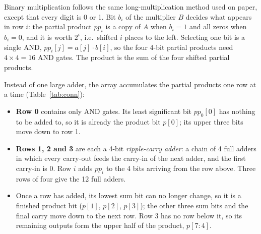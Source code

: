 \documentclass[10pt,a4paper,twocolumn]{article}
\begin{document}
Binary multiplication follows the same long-multiplication method used on paper, except that every digit
is 0 or 1. Bit $b_i$ of the multiplier $B$ decides what appears in row $i$: the partial product $pp_i$ is a
copy of $A$ when $b_i = 1$ and all zeros when $b_i = 0$, and it is worth $2^i$, i.e.\ shifted $i$ places to the
left. Selecting one bit is a single AND, $pp_i[j] = a[j] \cdot b[i]$, so the four 4-bit partial products need
$4 \times 4 = 16$ AND gates. The product is the sum of the four shifted partial products.

Instead of one large adder, the array accumulates the partial products one row at a time
(Table~\ref{tab:conn}):
\begin{itemize}[nosep]
  \item \textbf{Row 0} contains only AND gates. Its least significant bit $pp_0[0]$ has nothing to be added
        to, so it is already the product bit $p[0]$; its upper three bits move down to row 1.
  \item \textbf{Rows 1, 2 and 3} are each a 4-bit \emph{ripple-carry adder}: a chain of 4 full adders in
        which every carry-out feeds the carry-in of the next adder, and the first carry-in is 0. Row $i$ adds
        $pp_i$ to the 4 bits arriving from the row above. Three rows of four give the 12 full adders.
  \item Once a row has added, its lowest sum bit can no longer change, so it is a finished product bit
        ($p[1]$, $p[2]$, $p[3]$); the other three sum bits and the final carry move down to the next row.
        Row 3 has no row below it, so its remaining outputs form the upper half of the product, $p[7{:}4]$.
\end{itemize}

\begin{table}[!t]
\centering
{}
\caption{Connections of the array ($j = 0 \ldots 3$; the first carry into each row is $c_i[0] = 0$).}\label{tab:conn}
\end{table}
\end{document}
